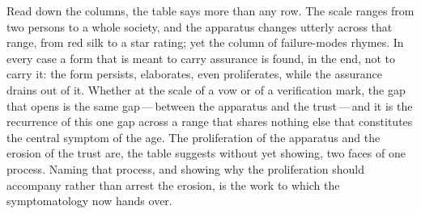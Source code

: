 \noindent
Read down the columns, the table says more than any row. The scale ranges from two persons to a whole society, and the apparatus changes utterly across that range, from red silk to a star rating; yet the column of failure-modes rhymes. In every case a form that is meant to carry assurance is found, in the end, not to carry it: the form persists, elaborates, even proliferates, while the assurance drains out of it. Whether at the scale of a vow or of a verification mark, the gap that opens is the same gap\,---\,between the apparatus and the trust\,---\,and it is the recurrence of this one gap across a range that shares nothing else that constitutes the central symptom of the age. The proliferation of the apparatus and the erosion of the trust are, the table suggests without yet showing, two faces of one process. Naming that process, and showing why the proliferation should accompany rather than arrest the erosion, is the work to which the symptomatology now hands over.

